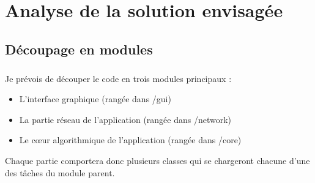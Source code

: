 \documentclass[a4paper,12pt]{report}
\begin{document}
\chapter{Analyse de la solution envisagée}
\section{Découpage en modules}
\paragraph{}
Je prévois de découper le code en trois modules principaux : 
\begin{itemize}
    \item L'interface graphique (rangée dans /gui)
    \item La partie réseau de l'application (rangée dans /network)
    \item Le c\oe{}ur algorithmique de l'application (rangée dans /core)
\end{itemize}
Chaque partie comportera donc plusieurs classes qui se chargeront chacune d'une des tâches du module parent.
\end{document}

